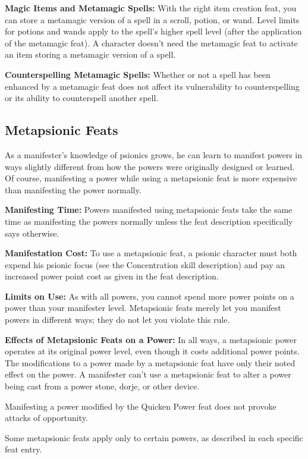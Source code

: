 \textbf{Magic Items and Metamagic Spells:} With the right item creation feat, you can store a metamagic version of a spell in a scroll, potion, or wand. Level limits for potions and wands apply to the spell's higher spell level (after the application of the metamagic feat). A character doesn't need the metamagic feat to activate an item storing a metamagic version of a spell.

\textbf{Counterspelling Metamagic Spells:} Whether or not a spell has been enhanced by a metamagic feat does not affect its vulnerability to counterspelling or its ability to counterspell another spell.

\subsection{Metapsionic Feats}
As a manifester's knowledge of psionics grows, he can learn to manifest powers in ways slightly different from how the powers were originally designed or learned. Of course, manifesting a power while using a metapsionic feat is more expensive than manifesting the power normally.

\textbf{Manifesting Time:} Powers manifested using metapsionic feats take the same time as manifesting the powers normally unless the feat description specifically says otherwise.

\textbf{Manifestation Cost:} To use a metapsionic feat, a psionic character must both expend his psionic focus (see the Concentration skill description) and pay an increased power point cost as given in the feat description.

\textbf{Limits on Use:} As with all powers, you cannot spend more power points on a power than your manifester level. Metapsionic feats merely let you manifest powers in different ways; they do not let you violate this rule.

\textbf{Effects of Metapsionic Feats on a Power:} In all ways, a metapsionic power operates at its original power level, even though it costs additional power points. The modifications to a power made by a metapsionic feat have only their noted effect on the power. A manifester can't use a metapsionic feat to alter a power being cast from a power stone, dorje, or other device.

Manifesting a power modified by the Quicken Power feat does not provoke attacks of opportunity.

Some metapsionic feats apply only to certain powers, as described in each specific feat entry.

